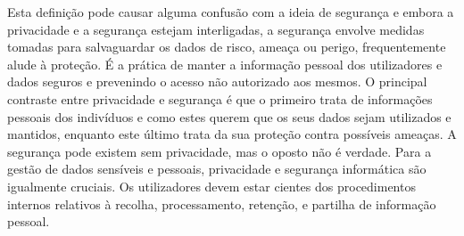 \documentclass[conference]{IEEEtran}
\begin{document}

Esta definição pode causar alguma confusão com a ideia de segurança \cite{HIVDifference}
e embora a privacidade e a segurança estejam interligadas, a segurança envolve
medidas tomadas para salvaguardar os dados de risco, ameaça ou perigo, frequentemente
alude à proteção. É a prática de manter a informação pessoal dos utilizadores
e dados seguros e prevenindo o acesso não autorizado aos mesmos. O principal
contraste entre privacidade e segurança é que o primeiro trata de informações
pessoais dos indivíduos e como estes querem que os seus dados sejam utilizados
e mantidos, enquanto este último trata da sua proteção contra possíveis ameaças.
A segurança pode existem sem privacidade, mas o oposto não é verdade. Para
a gestão de dados sensíveis e pessoais, privacidade e segurança informática
são igualmente cruciais. Os utilizadores devem estar cientes dos procedimentos
internos relativos à recolha, processamento, retenção, e partilha de informação
pessoal.
\end{document}
